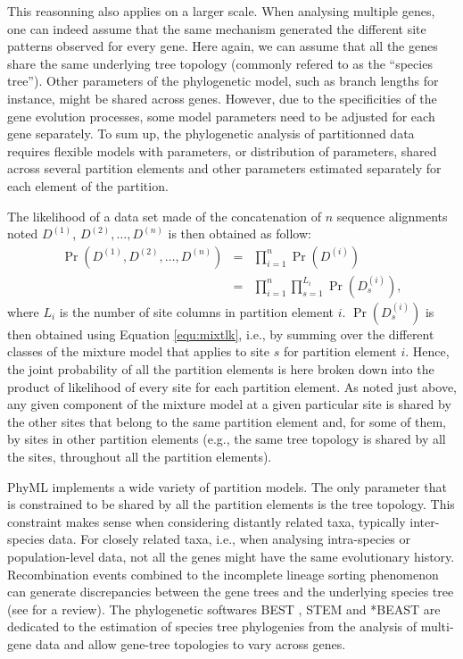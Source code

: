 \documentclass[a4paper,12pt]{article}
\begin{document}
This reasonning  also applies on a  larger scale. When  analysing multiple genes, one  can indeed
assume that the same  mechanism generated the different site patterns observed  for every gene. Here
again, we can assume that all the genes share the same underlying tree topology (commonly refered to
as the ``species  tree'').  Other parameters of  the phylogenetic model, such as  branch lengths for
instance, might  be shared across  genes. However,  due to the  specificities of the  gene evolution
processes, some  model parameters  need to be  adjusted for  each gene separately.   To sum  up, the
phylogenetic analysis of partitionned data requires flexible models with parameters, or distribution
of parameters,  shared across several partition  elements and other parameters  estimated separately
for each element of the partition.

The likelihood of a  data set made of the concatenation of $n$  sequence alignments noted $D^{(1)}$,
$D^{(2)}, \ldots, D^{(n)}$ is then obtained as follow:
\begin{eqnarray}
\Pr(D^{(1)},D^{(2)},\ldots,D^{(n)}) &=& \prod_{i=1}^{n}  \Pr(D^{(i)}) \nonumber\\
&=& \prod_{i=1}^{n}  \prod_{s=1}^{L_i} \Pr(D^{(i)}_s),
\end{eqnarray} where $L_i$ is the number of site columns in partition element $i$.  $\Pr(D^{(i)}_s)$
is then obtained using Equation \ref{equ:mixtlk}, i.e., by summing over the different classes of the
mixture model that  applies to site $s$ for  partition element $i$. Hence, the  joint probability of
all the partition elements is here broken down into the product of likelihood of every site for each
partition  element. As  noted just  above,  any given  component of  the  mixture model  at a  given
particular site is shared by the other sites that belong to the same partition element and, for some
of them, by  sites in other partition  elements (e.g., the same  tree topology is shared  by all the
sites, throughout all the partition elements).

PhyML implements a wide  variety of partition models.  The only parameter that  is constrained to be
shared  by all  the  partition elements  is  the tree  topology. This  constraint  makes sense  when
considering distantly  related taxa, typically inter-species  data. For closely related  taxa, i.e.,
when  analysing intra-species  or population-level  data,  not all  the  genes might  have the  same
evolutionary history.   Recombination events combined  to the incomplete lineage  sorting phenomenon
can  generate  discrepancies   between  the  gene  trees  and  the   underlying  species  tree  (see
\cite{degnan09}  for  a review).   The  phylogenetic  softwares BEST  \cite{best},  STEM
\cite{stem} and  *BEAST \cite{startbeast} are dedicated  to the estimation
of species tree phylogenies  from the analysis of multi-gene data and  allow gene-tree topologies to
vary across genes.
\end{document}
